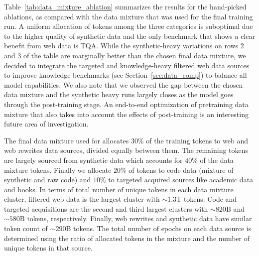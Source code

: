 Table~\ref{tab:data_mixture_ablation} summarizes the results for the hand-picked ablations, as compared with the data mixture that was used for the final training run. A uniform allocation of tokens among the three categories is suboptimal due to the higher quality of synthetic data and the only benchmark that shows a clear benefit from web data is TQA. While the synthetic-heavy variations on rows 2 and 3 of the table are marginally better than the chosen final data mixture, we decided to integrate the targeted and knowledge-heavy filtered web data sources to improve knowledge benchmarks (see Section~\ref{sec:data_comp}) to balance all model capabilities. We also note that we observed the gap between the chosen data mixture and the synthetic heavy runs largely closes as the model goes through the post-training stage. An end-to-end optimization of pretraining data mixture that also takes into account the effects of post-training is an interesting future area of investigation.

\begin{table}[ht]
\centering
{}
\caption{Data mixture for pretraining.}
\end{table}

The final data mixture used for \model allocates $30\%$ of the training tokens to web and web rewrites data sources, divided equally between them. The remaining tokens are largely sourced from synthetic data which accounts for $40\%$ of the data mixture tokens. Finally we allocate $20\%$ of tokens to code data (mixture of synthetic and raw code) and $10\%$ to targeted acquired sources like academic data and books. In terms of total number of unique tokens in each data mixture cluster, filtered web data is the largest cluster with $\sim1.3$T tokens. Code and targeted acquisitions are the second and third largest clusters with $\sim820$B and $\sim580$B tokens, respectively. Finally, web rewrites and synthetic data have similar token count of $\sim290$B tokens. The total number of epochs on each data source is determined using the ratio of allocated tokens in the mixture and the number of unique tokens in that source.

